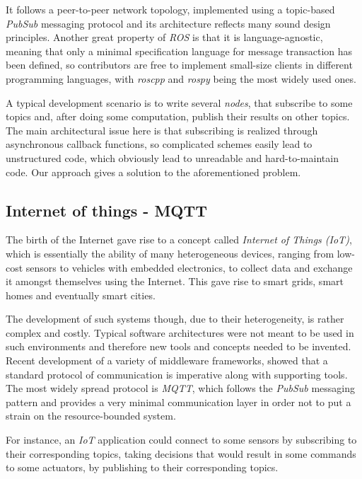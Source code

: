 \documentclass[sigplan,review,anonymous]{acmart}
\begin{document}
It follows a peer-to-peer network topology, implemented using a topic-based
\textit{PubSub} messaging protocol and its architecture reflects many sound
design principles. Another great property of \textit{ROS} is that it is
language-agnostic, meaning that only a minimal specification language for
message transaction has been defined, so contributors are free to implement
small-size clients in different programming languages, with \textit{roscpp} and
\textit{rospy} being the most widely used ones.

A typical development scenario is to write several \textit{nodes}, that
subscribe to some topics and, after doing some computation, publish their
results on other topics. The main architectural issue here is that subscribing
is realized through asynchronous callback functions, so complicated schemes
easily lead to unstructured code, which obviously lead to unreadable and
hard-to-maintain code. Our approach gives a solution to the aforementioned
problem.

\subsection{Internet of things - MQTT}

The birth of the Internet gave rise to a concept called \textit{Internet of
Things (IoT)}, which is essentially the ability of many heterogeneous devices,
ranging from low-cost sensors to vehicles with embedded electronics, to collect
data and exchange it amongst themselves using the Internet. This gave rise to
smart grids, smart homes and eventually smart cities.

The development of such systems though, due to their heterogeneity, is rather
complex and costly. Typical software architectures were not meant to be used in
such environments and therefore new tools and concepts needed to be invented.
Recent development of a variety of middleware frameworks, showed that a standard
protocol of communication is imperative along with supporting
tools\cite{iot_middleware}. The most widely spread protocol is \textit{MQTT},
which follows the \textit{PubSub} messaging pattern and provides a very minimal
communication layer in order not to put a strain on the resource-bounded
system\cite{mqtt}.

For instance, an \textit{IoT} application could connect to some sensors by
subscribing to their corresponding topics, taking decisions that would result in
some commands to some actuators, by publishing to their corresponding topics.
\end{document}

